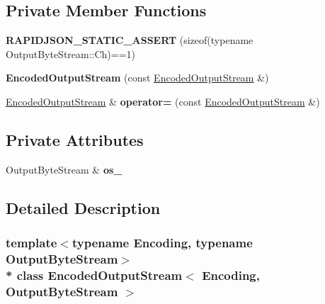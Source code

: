 \subsection*{Private Member Functions}
\begin{DoxyCompactItemize}
\item 
{\bfseries R\+A\+P\+I\+D\+J\+S\+O\+N\+\_\+\+S\+T\+A\+T\+I\+C\+\_\+\+A\+S\+S\+E\+RT} (sizeof(typename Output\+Byte\+Stream\+::\+Ch)==1)\hypertarget{class_encoded_output_stream_a108d370af476c4c5cbc1eeeb7a171d1e}{}\label{class_encoded_output_stream_a108d370af476c4c5cbc1eeeb7a171d1e}

\item 
{\bfseries Encoded\+Output\+Stream} (const \hyperlink{class_encoded_output_stream}{Encoded\+Output\+Stream} \&)\hypertarget{class_encoded_output_stream_a247a71781f8ba29b7f8e7182bf398c7c}{}\label{class_encoded_output_stream_a247a71781f8ba29b7f8e7182bf398c7c}

\item 
\hyperlink{class_encoded_output_stream}{Encoded\+Output\+Stream} \& {\bfseries operator=} (const \hyperlink{class_encoded_output_stream}{Encoded\+Output\+Stream} \&)\hypertarget{class_encoded_output_stream_aea0f29efebf92a500632f02f2d961a96}{}\label{class_encoded_output_stream_aea0f29efebf92a500632f02f2d961a96}

\end{DoxyCompactItemize}
\subsection*{Private Attributes}
\begin{DoxyCompactItemize}
\item 
Output\+Byte\+Stream \& {\bfseries os\+\_\+}\hypertarget{class_encoded_output_stream_a92839793e0a22a1da7a9008187728746}{}\label{class_encoded_output_stream_a92839793e0a22a1da7a9008187728746}

\end{DoxyCompactItemize}


\subsection{Detailed Description}
\subsubsection*{template$<$typename Encoding, typename Output\+Byte\+Stream$>$\\*
class Encoded\+Output\+Stream$<$ Encoding, Output\+Byte\+Stream $>$}

